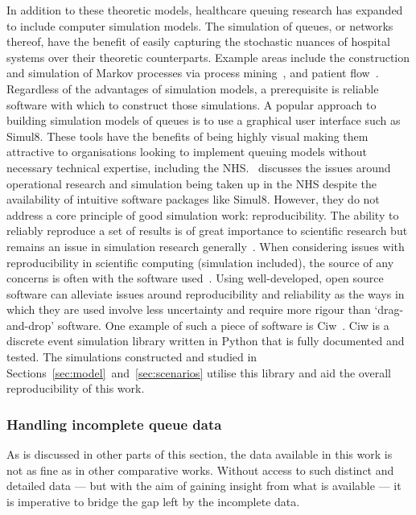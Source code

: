 \documentclass[11pt]{article}
\begin{document}
In addition to these theoretic models, healthcare queuing research has expanded
to include computer simulation models. The simulation of queues, or networks
thereof, have the benefit of easily capturing the stochastic nuances of hospital
systems over their theoretic counterparts. Example areas include the
construction and simulation of Markov processes via process
mining~\cite{Arnolds2018,Rebuge2012}, and patient flow~\cite{Bhattacharjee2014}.
Regardless of the advantages of simulation models, a prerequisite is reliable
software with which to construct those simulations. A popular approach to
building simulation models of queues is to use a graphical user interface such
as Simul8. These tools have the benefits of being highly visual making them
attractive to organisations looking to implement queuing models without
necessary technical expertise, including the NHS.~\cite{Brailsford2013}
discusses the issues around operational research and simulation being taken up
in the NHS despite the availability of intuitive software packages like Simul8.
However, they do not address a core principle of good simulation work:
reproducibility. The ability to reliably reproduce a set of results is of great
importance to scientific research but remains an issue in simulation research
generally~\cite{Fitzpatrick2019}. When considering issues with reproducibility
in scientific computing (simulation included), the source of any concerns is
often with the software used~\cite{Ivie2018}. Using well-developed, open source
software can alleviate issues around reproducibility and reliability as the ways
in which they are used involve less uncertainty and require more rigour than
`drag-and-drop' software. One example of such a piece of software is
Ciw~\cite{Palmer2019}. Ciw is a discrete event simulation library written in
Python that is fully documented and tested. The simulations constructed and
studied in Sections~\ref{sec:model}~and~\ref{sec:scenarios} utilise this library
and aid the overall reproducibility of this work.

\subsubsection{Handling incomplete queue data}

As is discussed in other parts of this section, the data available in this work
is not as fine as in other comparative works. Without access to such distinct
and detailed data --- but with the aim of gaining insight from what is available
--- it is imperative to bridge the gap left by the incomplete data.
\end{document}
